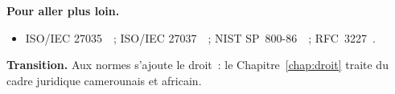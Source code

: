 \bigskip

\begin{boxinfo}
\textbf{Pour aller plus loin.}
\begin{itemize}
    \item ISO/IEC 27035~\cite{iso27035}~; ISO/IEC 27037~\cite{iso27037}~;
          NIST SP~800-86~\cite{nist80086}~; RFC~3227~\cite{rfc3227}.
\end{itemize}
\end{boxinfo}

\begin{boxinfo}
\textbf{Transition.} Aux normes s'ajoute le droit~: le
Chapitre~\ref{chap:droit} traite du cadre juridique camerounais et africain.
\end{boxinfo}
